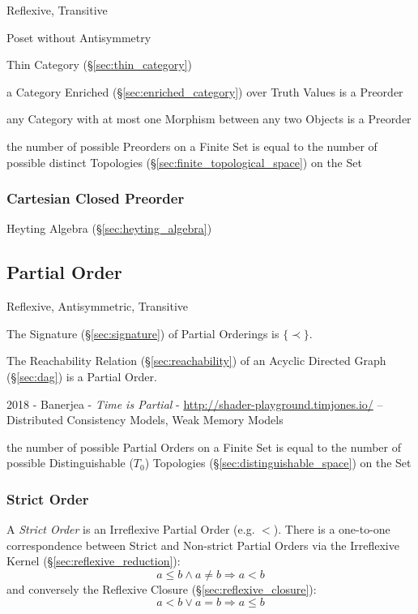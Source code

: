 Reflexive, Transitive

Poset without Antisymmetry

Thin Category (\S\ref{sec:thin_category})

a Category Enriched (\S\ref{sec:enriched_category}) over Truth Values
is a Preorder

any Category with at most one Morphism between any two Objects is a Preorder

the number of possible Preorders on a Finite Set is equal to the number of
possible distinct Topologies (\S\ref{sec:finite_topological_space}) on the Set



\subsubsection{Cartesian Closed Preorder}\label{sec:cartesian_preorder}

Heyting Algebra (\S\ref{sec:heyting_algebra})



\subsection{Partial Order}\label{sec:partial_order}

Reflexive, Antisymmetric, Transitive

The Signature (\S\ref{sec:signature}) of Partial Orderings is
$\{\prec\}$.

The Reachability Relation (\S\ref{sec:reachability}) of an Acyclic
Directed Graph (\S\ref{sec:dag}) is a Partial Order.

2018 - Banerjea - \emph{Time is Partial} -
\url{http://shader-playground.timjones.io/} -- Distributed Consistency Models,
Weak Memory Models

the number of possible Partial Orders on a Finite Set is equal to the number of
possible Distinguishable ($T_0$) Topologies
(\S\ref{sec:distinguishable_space}) on the Set



\subsubsection{Strict Order}\label{sec:strict_order}

A \emph{Strict Order} is an Irreflexive Partial Order (e.g. $<$).
There is a one-to-one correspondence between Strict and Non-strict
Partial Orders via the Irreflexive Kernel
(\S\ref{sec:reflexive_reduction}):
\[
  a \leq b \wedge a \neq b \Rightarrow a < b
\]
and conversely the Reflexive Closure (\S\ref{sec:reflexive_closure}):
\[
  a < b \vee a = b \Rightarrow a \leq b
\]



